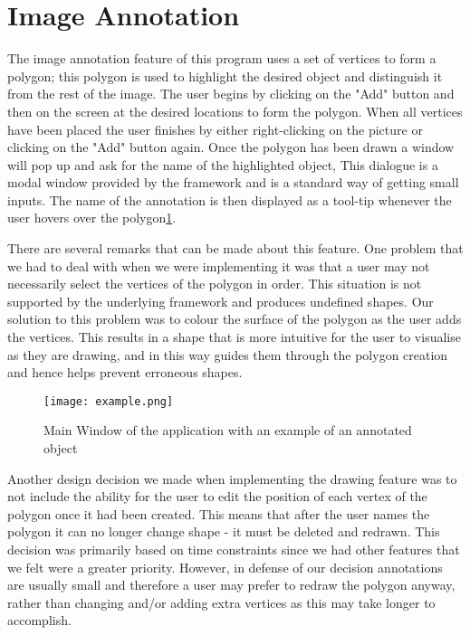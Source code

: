 \section{Image Annotation}
The image annotation feature of this program uses a set of vertices to form a polygon; this polygon is used to highlight the desired object and distinguish it from the rest of the image. The user begins by clicking on the "Add" button and then on the screen at the desired locations to form the polygon. When all vertices have been placed the user finishes by either right-clicking on the picture or clicking on the "Add" button again.  Once the polygon has been drawn a window will pop up and ask for the name of the highlighted object, This dialogue is a modal window provided by the framework and is a standard way of getting small inputs. The name of the annotation is then displayed as a tool-tip whenever the user hovers over the polygon\ref{fig:fullView}.

There are several remarks that can be made about this feature. One problem that we had to deal with when we were implementing it was that a user may not necessarily select the vertices of the polygon in order. This situation is not supported by the underlying framework and produces undefined shapes. Our solution to this problem was to colour the surface of the polygon as the user adds the vertices. This results in a shape that is more intuitive for the user to visualise as they are drawing, and in this way guides them through the polygon creation and hence helps prevent erroneous shapes.

\begin{figure}[h!]
\centering
\texttt{[image: example.png]}
\caption{Main Window of the application with an example of an annotated object}
\label{fig:fullView}
\end{figure}

Another design decision we made when implementing the drawing feature was to not include the ability for the user to edit the position of each vertex of the polygon once it had been created. This means that after the user names the polygon it can no longer change shape - it must be deleted and redrawn. This decision was primarily based on time constraints since we had other features that we felt were a greater priority.  However, in defense of our decision annotations are usually small and therefore a user may prefer to redraw the polygon anyway, rather than changing and/or adding extra vertices as this may take longer to accomplish.
